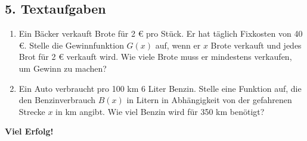 \subsection*{5. Textaufgaben}
\begin{enumerate}
    \item Ein Bäcker verkauft Brote für 2 € pro Stück. Er hat täglich Fixkosten von 40 €. Stelle die Gewinnfunktion $G(x)$ auf, wenn er $x$ Brote verkauft und jedes Brot für 2 € verkauft wird. Wie viele Brote muss er mindestens verkaufen, um Gewinn zu machen?
    \item Ein Auto verbraucht pro 100 km 6 Liter Benzin. Stelle eine Funktion auf, die den Benzinverbrauch $B(x)$ in Litern in Abhängigkeit von der gefahrenen Strecke $x$ in km angibt. Wie viel Benzin wird für 350 km benötigt?
\end{enumerate}

\vspace{1cm}
\textbf{Viel Erfolg!}
